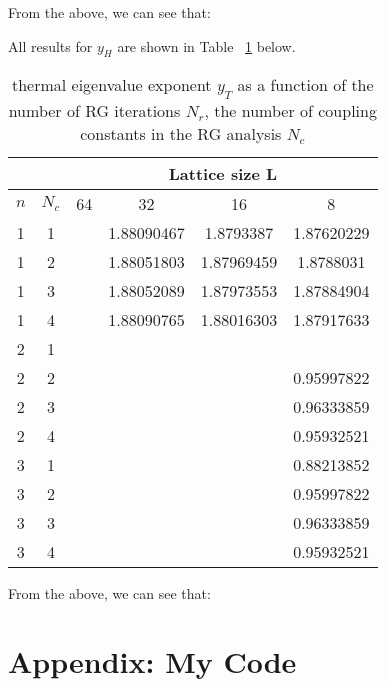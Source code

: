 \documentclass{article}
\begin{document}
From the above, we can see that: 


All results for $y_H$ are shown in Table ~\ref{yH} below.

\begin{table}[H]
\centering
\begin{tabular}{|c|c|c|c|c|c|} 
\hline
 \multicolumn{2}{|c|}{ }& \multicolumn{4}{c|}{Lattice size L}\\
 \hline
 $n$ & $N_c$ & 64 & 32 & 16 & 8 \\
 \hline
 1 & 1 & & 1.88090467 & 1.8793387 & 1.87620229\\
 1 & 2 & & 1.88051803 & 1.87969459 & 1.8788031\\
 1 & 3 & & 1.88052089 & 1.87973553 & 1.87884904\\
 1 & 4 & & 1.88090765 & 1.88016303 & 1.87917633\\
 \hline
 2 & 1 & & & & \\
 2 & 2 & & & & 0.95997822\\
 2 & 3 & & & & 0.96333859\\
 2 & 4 & & & & 0.95932521\\
 \hline
 3 & 1 & & & & 0.88213852\\
 3 & 2 & & & & 0.95997822\\
 3 & 3 & & & & 0.96333859\\
 3 & 4 & & & & 0.95932521\\
 \hline
 \end{tabular}
 \caption{\label{yH}thermal eigenvalue
exponent $y_T$ as a function of the number of RG iterations $N_r$, the number of coupling
constants in the RG analysis $N_c$}
\end{table}

From the above, we can see that: 




\appendix

\section*{Appendix: My Code}


\iffalse

\inputminted[]{python}{"MCRG with Cluster MC - Working Version.py"}
\fi
\end{document}
